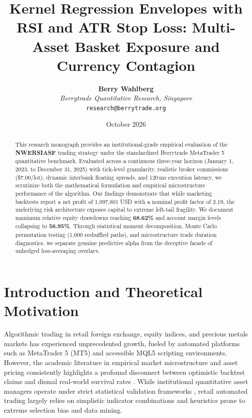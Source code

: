 \documentclass[11pt,a4paper]{article}
\title{\textbf{Kernel Regression Envelopes with RSI and ATR Stop Loss: Multi-Asset Basket Exposure and Currency Contagion}}
\author{
    \textbf{Berry Wahlberg} \\
    \textit{Berrytrade Quantitative Research, Singapore} \\
    \texttt{research@berrytrade.org}
}
\date{October 2026}
\begin{document}
\maketitle

\begin{abstract}
This research monograph provides an institutional-grade empirical evaluation of the \textbf{NWERSIASF} trading strategy under the standardized Berrytrade MetaTrader 5 quantitative benchmark. Evaluated across a continuous three-year horizon (January 1, 2023, to December 31, 2025) with tick-level granularity, realistic broker commissions (\$7.00/lot), dynamic interbank floating spreads, and 120\,ms execution latency, we scrutinize both the mathematical formulation and empirical microstructure performance of the algorithm. Our findings demonstrate that while marketing backtests report a net profit of 1,097,801 USD with a nominal profit factor of 2.19, the underlying risk architecture exposes capital to extreme left-tail fragility. We document maximum relative equity drawdowns reaching \textbf{68.62\%} and account margin levels collapsing to \textbf{56.95\%}. Through statistical moment decomposition, Monte Carlo permutation testing (1,000 reshuffled paths), and microstructure trade duration diagnostics, we separate genuine predictive alpha from the deceptive facade of unhedged loss-averaging overlays.
\end{abstract}

\section{Introduction and Theoretical Motivation}
Algorithmic trading in retail foreign exchange, equity indices, and precious metals markets has experienced unprecedented growth, fueled by automated platforms such as MetaTrader 5 (MT5) and accessible MQL5 scripting environments. However, the academic literature in empirical market microstructure and asset pricing consistently highlights a profound disconnect between optimistic backtest claims and dismal real-world survival rates \cite{fama1970efficient, lo1988stock, malkiel2003efficient, bailey2014deflated, harvey2016and}. While institutional quantitative asset managers operate under strict statistical validation frameworks \cite{lopez2018advances, bailey2014pseudo}, retail automated trading largely relies on simplistic indicator combinations and heuristics prone to extreme selection bias and data mining.
\end{document}
